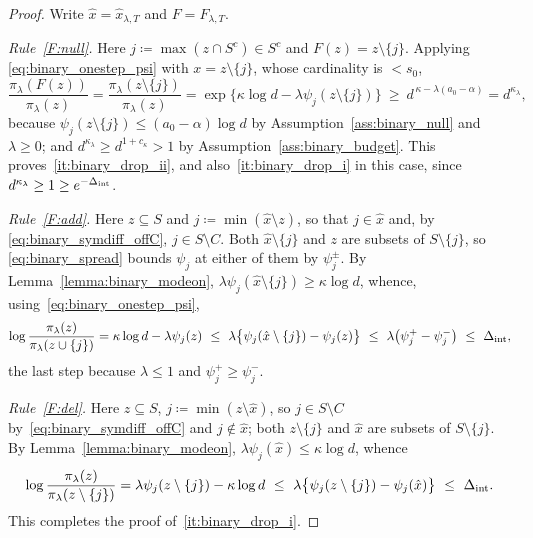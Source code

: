 \documentclass[aos]{imsart}%
\theoremstyle{plain}
\theoremstyle{definition}
\begin{document}
    \begin{proof}
        Write $\hat x=\hat x_{\lambda,T}$ and $F=F_{\lambda,T}$.

        \emph{Rule~\ref{F:null}.} Here $j\coloneq\max(z\cap S^{c})\in S^{c}$
        and $F(z)=z\setminus\{j\}$. Applying
        \eqref{eq:binary_onestep_psi} with $x=z\setminus\{j\}$, whose
        cardinality is $<s_0$,
        \begin{equation*}
            \frac{\pi_\lambda(F(z))}{\pi_\lambda(z)}
            =\frac{\pi_\lambda(z\setminus\{j\})}{\pi_\lambda(z)}
            =\exp\bigl\{\kappa\log d-\lambda\psi_j(z\setminus\{j\})\bigr\}
            \ \geq\ d^{\,\kappa-\lambda(a_0-\alpha)}=d^{\kappa_\lambda},
        \end{equation*}
        because $\psi_j(z\setminus\{j\})\leq(a_0-\alpha)\log d$ by
        Assumption~\ref{ass:binary_null} and $\lambda\geq0$; and
        $d^{\kappa_\lambda}\geq d^{1+c_\kappa}>1$ by
        Assumption~\ref{ass:binary_budget}. This
        proves~\ref{it:binary_drop_ii}, and also~\ref{it:binary_drop_i} in this
        case, since $d^{\kappa_\lambda}\geq1\geq e^{-\Delta_{\mathrm{int}}}$.

        \emph{Rule~\ref{F:add}.} Here $z\subseteq S$ and
        $j\coloneq\min(\hat x\setminus z)$, so that $j\in\hat x$ and, by
        \eqref{eq:binary_symdiff_offC}, $j\in S\setminus C$. Both
        $\hat x\setminus\{j\}$ and $z$ are subsets of $S\setminus\{j\}$, so
        \eqref{eq:binary_spread} bounds $\psi_j$ at either of them by
        $\psi_j^{\pm}$. By Lemma~\ref{lemma:binary_modeon},
        $\lambda\psi_j(\hat x\setminus\{j\})\geq\kappa\log d$, whence,
        using~\eqref{eq:binary_onestep_psi},
        \begin{equation}
            \label{eq:binary_drop_b}
            \log\frac{\pi_\lambda(z)}{\pi_\lambda(z\cup\{j\})}
            =\kappa\log d-\lambda\psi_j(z)
            \ \leq\ \lambda\bigl\{\psi_j(\hat x\setminus\{j\})
            -\psi_j(z)\bigr\}
            \ \leq\ \lambda\bigl(\psi_j^{+}-\psi_j^{-}\bigr)
            \ \leq\ \Delta_{\mathrm{int}},
        \end{equation}
        the last step because $\lambda\leq1$ and $\psi_j^{+}\geq\psi_j^{-}$.

        \emph{Rule~\ref{F:del}.} Here $z\subseteq S$,
        $j\coloneq\min(z\setminus\hat x)$, so $j\in S\setminus C$
        by~\eqref{eq:binary_symdiff_offC} and $j\notin\hat x$; both
        $z\setminus\{j\}$ and $\hat x$ are subsets of $S\setminus\{j\}$. By
        Lemma~\ref{lemma:binary_modeon},
        $\lambda\psi_j(\hat x)\leq\kappa\log d$, whence
        \begin{equation}
            \label{eq:binary_drop_c}
            \log\frac{\pi_\lambda(z)}{\pi_\lambda(z\setminus\{j\})}
            =\lambda\psi_j(z\setminus\{j\})-\kappa\log d
            \ \leq\ \lambda\bigl\{\psi_j(z\setminus\{j\})
            -\psi_j(\hat x)\bigr\}\ \leq\ \Delta_{\mathrm{int}} .
        \end{equation}
        This completes the proof of~\ref{it:binary_drop_i}.


\end{proof}
\end{document}
